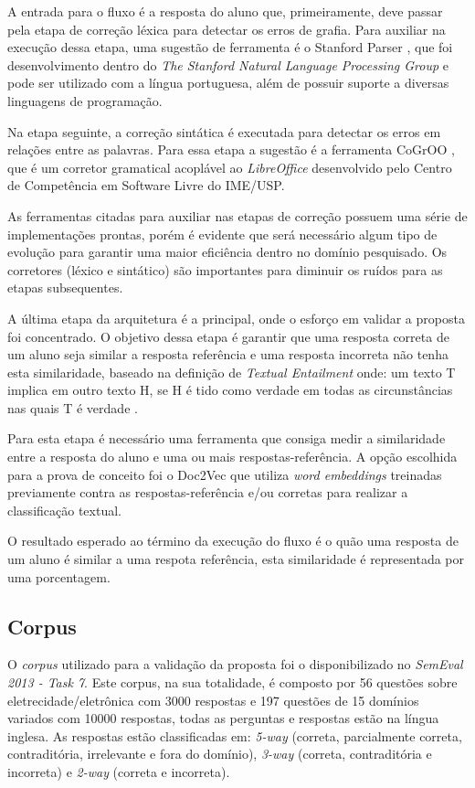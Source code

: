 \documentclass[conference]{IEEEtran}
\begin{document}
A entrada para o fluxo é a resposta do aluno que, primeiramente, deve passar pela etapa de correção léxica para detectar os erros de grafia. Para auxiliar na execução dessa etapa, uma sugestão de ferramenta é o Stanford Parser \cite{StanfordParser:2005}, que foi desenvolvimento dentro do \textit{The Stanford Natural Language Processing Group} e pode ser utilizado com a língua portuguesa, além de possuir suporte a diversas linguagens de programação. 

Na etapa seguinte, a correção sintática é executada para detectar os erros em relações entre as palavras. Para essa etapa a sugestão é a ferramenta CoGrOO \cite{CCSL:2013}, que é um corretor gramatical acoplável ao \textit{LibreOffice} desenvolvido pelo Centro de Competência em Software Livre do IME/USP. 

As ferramentas citadas para auxiliar nas etapas de correção possuem uma série de implementações prontas, porém é evidente que será necessário algum tipo de evolução para garantir uma maior eficiência dentro no domínio pesquisado. Os corretores (léxico e sintático) são importantes para diminuir os ruídos para as etapas subsequentes.

A última etapa da arquitetura é a principal, onde o esforço em validar a proposta foi concentrado. O objetivo dessa etapa é garantir que uma resposta correta de um aluno seja similar a resposta referência e uma resposta incorreta não tenha esta similaridade, baseado na definição de \textit{Textual Entailment} onde: um texto T implica em outro texto H, se H é tido como verdade em todas as circunstâncias nas quais T é verdade \cite{Dagan:2006}.

Para esta etapa é necessário uma ferramenta que consiga medir a similaridade entre a resposta do aluno e uma ou mais respostas-referência. A opção escolhida para a prova de conceito foi o Doc2Vec \cite{Mikolov:2016} que utiliza \textit{word embeddings} treinadas previamente contra as respostas-referência e/ou corretas para realizar a classificação textual. 

O resultado esperado ao término da execução do fluxo é o quão uma resposta de um aluno é similar a uma respota referência, esta similaridade é representada por uma porcentagem.

\subsection{Corpus}
O \textit{corpus} utilizado para a validação da proposta foi o disponibilizado no \textit{SemEval 2013 - Task 7}\cite{Dzikovska:2013}. Este corpus, na sua totalidade,  é composto por 56 questões sobre eletrecidade/eletrônica com 3000 respostas e 197 questões de 15 domínios variados com 10000 respostas, todas as perguntas e respostas estão na língua inglesa. As respostas estão classificadas em: \textit{5-way} (correta, parcialmente correta, contraditória, irrelevante e fora do domínio), \textit{3-way} (correta, contraditória e incorreta) e \textit{2-way} (correta e incorreta).
\end{document}
